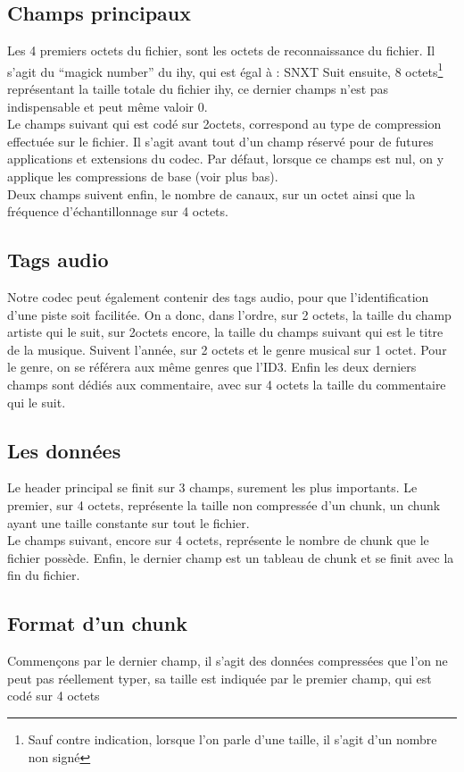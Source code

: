 \documentclass[a4paper,12pt]{article}
\begin{document}
\subsection{Champs principaux}
Les 4 premiers octets du fichier, sont les octets de reconnaissance du fichier.
Il s'agit du ``magick number'' du ihy, qui est égal à : SNXT
Suit ensuite, 8 octets\footnote{Sauf contre indication, lorsque l'on parle d'une
taille, il s'agit d'un nombre non signé}
représentant la taille totale du fichier ihy, ce dernier
champs n'est pas indispensable et peut même valoir 0.\\
Le champs suivant qui est codé sur 2octets, correspond au type de compression
effectuée sur le fichier. Il s'agit avant tout d'un champ réservé pour de
futures applications et extensions du codec. Par défaut, lorsque ce champs est
nul, on y applique les compressions de base (voir plus bas).\\
Deux champs suivent enfin, le nombre de canaux, sur un octet ainsi que la
fréquence d'échantillonnage sur 4 octets.\\
\subsection{Tags audio}
Notre codec peut également contenir des tags audio, pour que l'identification
d'une piste soit facilitée. On a donc, dans l'ordre, sur 2 octets, la taille du
champ artiste qui le suit, sur 2octets encore, la taille du champs suivant
qui est le titre de la musique. Suivent l'année, sur 2 octets et le genre
musical sur 1
octet. Pour le genre, on se référera aux même genres que l'ID3. Enfin les deux
derniers champs sont dédiés aux commentaire, avec sur 4 octets la taille du
commentaire qui le suit.
\subsection{Les données}
Le header principal se finit sur 3 champs, surement les plus importants. Le
premier, sur 4 octets, représente la taille non compressée d'un chunk, un chunk
ayant une taille constante sur tout le fichier.\\
Le champs suivant, encore sur 4 octets, représente le nombre de chunk que le
fichier possède. Enfin, le dernier champ est un tableau de chunk et se finit
avec la fin du fichier.
\subsection{Format d'un chunk}
Commençons par le dernier champ, il s'agit des données compressées que l'on ne
peut pas réellement typer, sa taille est indiquée par le premier champ, qui est
codé sur 4 octets
\end{document}
